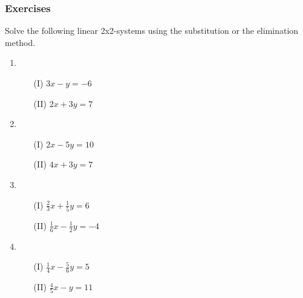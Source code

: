 \newpage

\subsubsection{Exercises}
\label{Uebungen}

\begin{exer}
Solve the following linear 2x2-systems using the substitution or the elimination method.

\begin{enumerate}[label=\emph{\alph*})]
\item 
\begin{itemize}
\item[(I)] $3x-y=-6$
\item[(II)] $2x+3y=7$
\end{itemize}
\vfill

\item
\begin{itemize}
\item[(I)] $2x-5y=10$
\item[(II)] $4x+3y=7$
\end{itemize}
\vfill

\item
\begin{itemize}
\item[(I)] $\frac 23 x + \frac15 y = 6$
\item[(II)] $\frac 16 x-\frac 12 y = -4$
\end{itemize}
\vfill

\item
\begin{itemize}
\item[(I)] $\frac 14 x - \frac 56 y = 5$
\item[(II)] $\frac45 x-y=11$
\end{itemize}
\end{enumerate}
\end{exer}
\vfill

